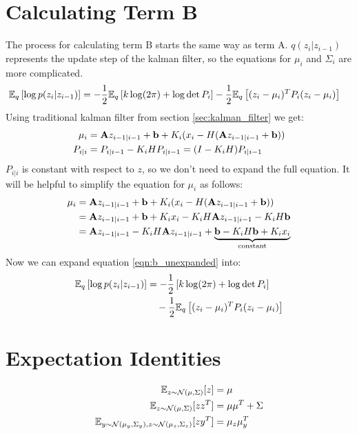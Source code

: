 \documentclass[12pt]{article}
\begin{document}
\section{Calculating Term B}
The process for calculating term B starts the same way as term A. $q(z_i|z_{i-1})$ represents the update step of the kalman filter, so the equations for $\mu_i$ and $\Sigma_i$ are more complicated.
\begin{align}
    \mathbb{E}_q \left[ \log p(z_i|z_{i-1})\right] &= -\frac{1}{2} \mathbb{E}_q \left[ k \log (2\pi) + \log \det P_i \right] - \frac{1}{2} \mathbb{E}_q \left[ (z_i - \mu_i)^T P_i (z_i - \mu_i) \right] \label{eqn:b_unexpanded}
\end{align}
Using traditional kalman filter from section \ref{sec:kalman_filter} we get:
\begin{align}
    \mu_i & = \mathbf{A} z_{i-1|i-1} + \mathbf{b} + K_i (x_i - H(\mathbf{A} z_{i-1|i-1} + \mathbf{b})) \\
    P_{i|i} &= P_{i|i-1} - K_i H P_{i|i-1} = (I-K_iH) P_{i|i-1}
\end{align}
$P_{i|i}$ is constant with respect to $z$, so we don't need to expand the full equation.
It will be helpful to simplify the equation for $\mu_i$ as follows:
\begin{align}
    \mu_i & = \mathbf{A} z_{i-1|i-1} + \mathbf{b} + K_i (x_i - H(\mathbf{A} z_{i-1|i-1} + \mathbf{b})) \\
    &= \mathbf{A} z_{i-1|i-1} + \mathbf{b} + K_i x_i - K_i H \mathbf{A} z_{i-1|i-1} - K_i H \mathbf{b} \\ 
    &= \mathbf{A} z_{i-1|i-1} - K_i H \mathbf{A} z_{i-1|i-1} + \underbrace{\mathbf{b} - K_i H \mathbf{b} + K_i x_i}_\text{constant}
\end{align}
Now we can expand equation \ref{eqn:b_unexpanded} into:
\begin{align}
    \mathbb{E}_q \left[ \log p(z_i|z_{i-1})\right] &= -\frac{1}{2} \left[ k \log (2\pi) + \log \det P_i \right] \\
    &\quad - \frac{1}{2} \mathbb{E}_q \left[ (z_i - \mu_i)^T P_i (z_i - \mu_i) \right]
\end{align}

\appendix
\section{Expectation Identities} \label{sec:expectation_identities}
\begin{align}
    \E_{z \sim \mathcal{N}(\mu, \Sigma)} [z] &= \mu \\
    \E_{z \sim \mathcal{N}(\mu, \Sigma)} [zz^T] &= \mu\mu^T + \Sigma \\
    \E_{y \sim \mathcal{N}(\mu_y, \Sigma_y), z \sim \mathcal{N}(\mu_z, \Sigma_z)} [zy^T] &= \mu_z \mu_y^T %
\end{align}
\end{document}
